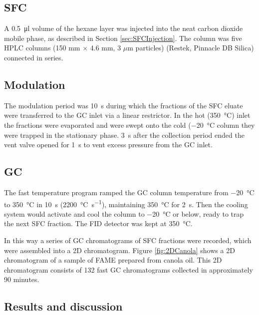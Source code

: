 \subsection{SFC}

A \SI{0.5}{\micro\litre} volume of the hexane layer was injected into the neat
carbon dioxide mobile phase, as described in Section \ref{sec:SFCInjection}. The
column was five HPLC columns (150 mm $\times$ 4.6 mm, 3 $\mu$m particles)
(Restek, Pinnacle DB Silica) connected in series.

\subsection{Modulation}

The modulation period was \SI{10}{\second} during which the fractions of the SFC
eluate were transferred to the GC inlet via a linear restrictor. In the hot
(\SI{350}{\celsius}) inlet the fractions were evaporated and were swept onto the
cold (\SI{-20}{\celsius} column they were trapped in the stationary phase.
\SI{3}{\second} after the collection period ended the vent valve opened for
\SI{1}{\second} to vent excess pressure from the GC inlet.

\subsection{GC}

The fast temperature program ramped the GC column temperature from
\SI{-20}{\celsius} to \SI{350}{\celsius} in \SI{10}{s}
(\SI{2200}{\celsius\per\second}), maintaining \SI{350}{\celsius} for
\SI{2}{\second}. Then the cooling system would activate and cool the column to
\SI{-20}{\celsius} or below, ready to trap the next SFC fraction. The FID
detector was kept at \SI{350}{\celsius}.

In this way a series of GC chromatograms of SFC fractions were recorded, which
were assembled into a 2D chromatogram. Figure \ref{fig:2DCanola} shows
a 2D chromatogram of a sample of FAME prepared from canola oil. This 2D
chromatogram consists of 132 fast GC chromatograms collected in approximately 90
minutes.

\subsection{Results and discussion}

